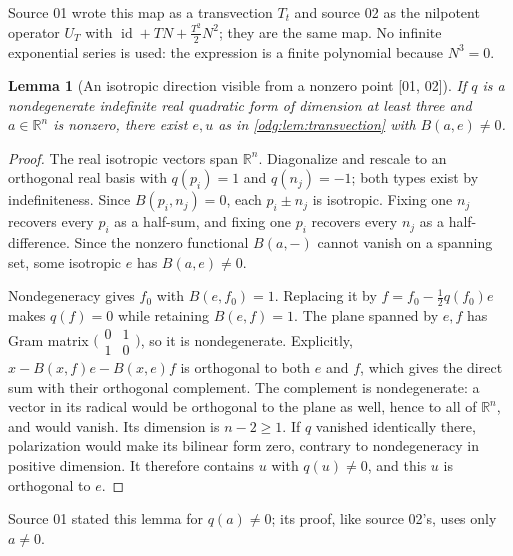 \documentclass[11pt,oneside]{article}
\numberwithin{equation}{section}
\newtheorem{lemma}[lemma]{Lemma}
\theoremstyle{definition}
\theoremstyle{remark}
\newcommand{\R}{\mathbb R}
\newcommand{\id}{\operatorname{id}}
\newcommand{\src}[1]{\textup{\textsf{\small[#1]}}}
\begin{document}
Source 01 wrote this map as a transvection $T_t$ and source 02 as the
nilpotent operator $U_T$ with $\id+TN+\tfrac{T^2}{2}N^2$; they are the same
map. No infinite exponential series is used: the expression is a finite
polynomial because $N^3=0$.

\begin{lemma}[An isotropic direction visible from a nonzero point \src{01, 02}]\label{odg:lem:nullchoices}
If $q$ is a nondegenerate indefinite real quadratic form of dimension at
least three and $a\in\R^n$ is nonzero, there exist $e,u$ as in
\cref{odg:lem:transvection} with $B(a,e)\ne0$.
\end{lemma}
\begin{proof}
The real isotropic vectors span $\R^n$. Diagonalize and rescale to an
orthogonal real basis with $q(p_i)=1$ and $q(n_j)=-1$; both types exist by
indefiniteness. Since $B(p_i,n_j)=0$, each $p_i\pm n_j$ is isotropic.
Fixing one $n_j$ recovers every $p_i$ as a half-sum, and fixing one $p_i$
recovers every $n_j$ as a half-difference. Since the nonzero functional
$B(a,-)$ cannot vanish on a spanning set, some isotropic $e$ has
$B(a,e)\ne0$.

Nondegeneracy gives $f_0$ with $B(e,f_0)=1$. Replacing it by
$f=f_0-\tfrac12q(f_0)e$ makes $q(f)=0$ while retaining $B(e,f)=1$.
The plane spanned by $e,f$ has Gram matrix
$\bigl(\begin{smallmatrix}0&1\\1&0\end{smallmatrix}\bigr)$, so it is
nondegenerate. Explicitly,
$x-B(x,f)e-B(x,e)f$ is orthogonal to both $e$ and $f$, which gives the direct
sum with their orthogonal complement. The complement is nondegenerate:
a vector in its radical would be orthogonal to the plane as well, hence to
all of $\R^n$, and would vanish. Its dimension is $n-2\ge1$. If $q$ vanished
identically there, polarization would make its bilinear form zero, contrary
to nondegeneracy in positive dimension. It therefore contains $u$ with
$q(u)\ne0$, and this $u$ is orthogonal to $e$.
\end{proof}

Source 01 stated this lemma for $q(a)\ne0$; its proof, like source 02's, uses
only $a\ne0$.
\end{document}
